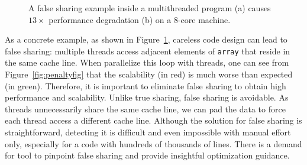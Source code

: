 \begin{figure}[htbp]
\centering
{}%
\hspace{30pt}
\caption{
A false sharing example inside a multithreaded program (a) causes $13\times$ performance degradation (b) on a 8-core machine.
\label{fig:penalty}}
\end{figure}

As a concrete example, as shown in Figure~\ref{fig:penalty}, careless code design can lead to false sharing: multiple threads access adjacent elements of {\tt array} that reside in the same cache line. When parallelize this loop with threads, one can see from Figure~\ref{fig:penaltyfig} that the scalability (in red) is much worse than expected (in green). Therefore, it is important to eliminate false sharing to obtain high performance and scalability. 
Unlike true sharing, false sharing is avoidable. As threads unnecessarily share the same cache line, we can pad the data to force each thread access a different cache line. Although the solution for false sharing is straightforward, detecting it is difficult and even impossible with manual effort only, especially for a code with hundreds of thousands of lines. There is a demand for tool to pinpoint false sharing and provide insightful optimization guidance.

